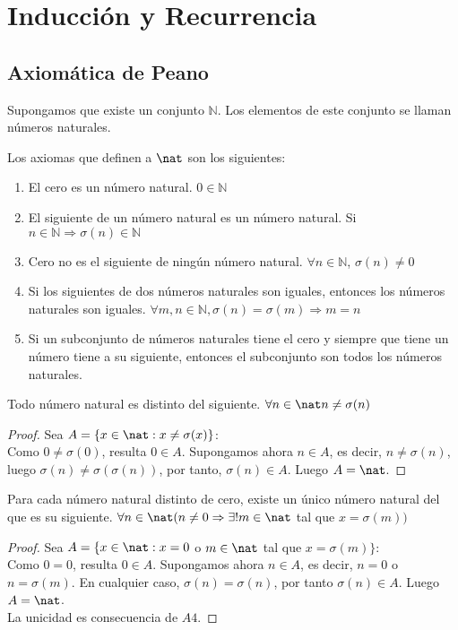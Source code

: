 \section{Inducción y Recurrencia}
\subsection{Axiomática de Peano}
Supongamos que existe un conjunto $\mathbb{N}$. Los elementos de este conjunto se llaman números naturales.
\begin{ndef}
Los axiomas que definen a $\nat$ son los siguientes:
\begin{enumerate}[label=\emph{A\arabic*}]
\item\label{a1} El cero es un número natural. $0 \in \mathbb{N}$
\item\label{a2} El siguiente de un número natural es un número natural. Si $n \in \mathbb{N} \Rightarrow \sigma(n) \in \mathbb{N}$
\item\label{a3} Cero no es el siguiente de ningún número natural. $\forall n \in \mathbb{N}$, $\sigma(n) \neq 0$
\item\label{a4} Si los siguientes de dos números naturales son iguales, entonces los números naturales son iguales. $\forall m,n \in \mathbb{N}, \sigma(n) = \sigma(m) \Rightarrow m = n$
\item\label{a5} Si un subconjunto de números naturales tiene el cero y siempre que tiene un número tiene a su siguiente, entonces el subconjunto son todos los números naturales.
\end{enumerate}
\end{ndef}

\begin{nth}
Todo número natural es distinto del siguiente. $\forall n \in \nat n \neq \sigma(n)$
\end{nth}
\begin{proof}
Sea $A = \{x \in \nat : x \neq \sigma(x)\}$: \\
Como $0 \neq \sigma(0)$, resulta $0 \in A$.
Supongamos ahora $n \in A$, es decir, $n \neq \sigma(n)$, luego $\sigma(n) \neq \sigma(\sigma(n))$, por tanto, $\sigma(n) \in A$.
Luego $A = \nat$.
\end{proof}

\begin{nth}
Para cada número natural distinto de cero, existe un único número natural del que es su siguiente. $\forall n \in \nat (n \neq 0 \Rightarrow \exists! m \in \nat$ tal que $x = \sigma(m))$
\end{nth}
\begin{proof}
Sea $A = \{x \in \nat : x = 0$ o $m \in \nat$ tal que $x = \sigma(m)\}$:\\
Como $0 = 0$, resulta $0 \in A$. Supongamos ahora $n \in A$, es decir, $n = 0$ o $n = \sigma(m)$. En cualquier caso, $\sigma(n) = \sigma(n)$, por tanto $\sigma(n) \in A$. Luego $A = \nat$. \\
La unicidad es consecuencia de $A4$.
\end{proof}

